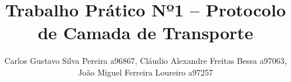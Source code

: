 \documentclass[runningheads]{llncs}
\title{Trabalho Prático Nº1 – Protocolo de Camada de Transporte}
\author{Carlos Gustavo Silva Pereira a96867, Cláudio Alexandre Freitas Bessa a97063, João Miguel Ferreira Loureiro a97257}
\institute{Universidade do Minho - Licenciatura em Engenharia Informática}
\begin{document}
\maketitle

\paragraph{}
\paragraph{}
\paragraph{}
\paragraph{}
\paragraph{}
\paragraph{}
\paragraph{}
\paragraph{}
\paragraph{}
\paragraph{}
\paragraph{}
\paragraph{}
\paragraph{}
\paragraph{}
\end{document}
